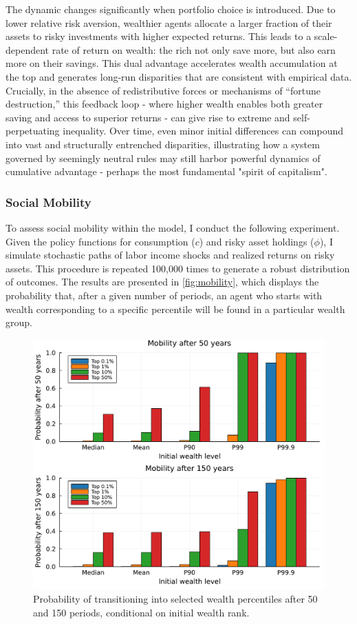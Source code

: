 \documentclass[12pt]{article}
\begin{document}
The dynamic changes significantly when portfolio choice is introduced. Due to lower relative risk aversion, wealthier agents allocate a larger fraction of their assets to risky investments with higher expected returns. This leads to a scale-dependent rate of return on wealth: the rich not only save more, but also earn more on their savings. This dual advantage accelerates wealth accumulation at the top and generates long-run disparities that are consistent with empirical data. Crucially, in the absence of redistributive forces or mechanisms of “fortune destruction,” this feedback loop - where higher wealth enables both greater saving and access to superior returns - can give rise to extreme and self-perpetuating inequality. Over time, even minor initial differences can compound into vast and structurally entrenched disparities, illustrating how a system governed by seemingly neutral rules may still harbor powerful dynamics of cumulative advantage - perhaps the most fundamental "spirit of capitalism".

\subsubsection{Social Mobility}

To assess social mobility within the model, I conduct the following experiment. Given the policy functions for consumption ($c$) and risky asset holdings ($\phi$), I simulate stochastic paths of labor income shocks and realized returns on risky assets. This procedure is repeated 100,000 times to generate a robust distribution of outcomes. The results are presented in \autoref{fig:mobility}, which displays the probability that, after a given number of periods, an agent who starts with wealth corresponding to a specific percentile will be found in a particular wealth group.

\begin{figure}[h]
    \centering
    \includegraphics[width=1.0 \textwidth]{figure_3.pdf}
    \caption{Probability of transitioning into selected wealth percentiles after 50 and 150 periods, conditional on initial wealth rank.}
    \label{fig:mobility}
\end{figure}
\end{document}
